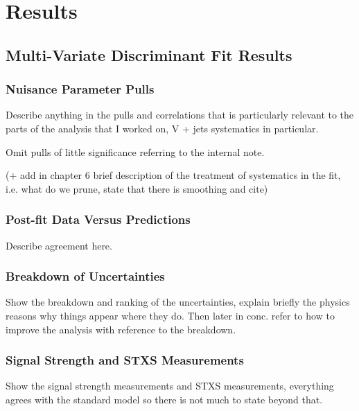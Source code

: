 \chapter{Results}%
\label{ch:results}
\section{\texorpdfstring{\VHbb}{VH->bb} Multi-Variate Discriminant Fit Results}%
\label{sec:mva-results}

\subsection{Nuisance Parameter Pulls}
Describe anything in the pulls and correlations that is particularly relevant to
the parts of the analysis that I worked on, V + jets systematics in particular.

Omit pulls of little significance referring to the internal note.

(+ add in chapter 6 brief description of the treatment of systematics in the
fit, i.e. what do we prune, state that there is smoothing and cite)


\clearpage
\newpage

\subsection{Post-fit Data Versus Predictions}
Describe agreement here.







\clearpage
\newpage

\subsection{Breakdown of Uncertainties}
Show the breakdown and ranking of the uncertainties, explain briefly the physics
reasons why things appear where they do. Then later in conc. refer to how to
improve the analysis with reference to the breakdown.


\subsection{Signal Strength and STXS Measurements}
Show the signal strength measurements and STXS measurements, everything agrees
with the standard model so there is not much to state beyond that.

